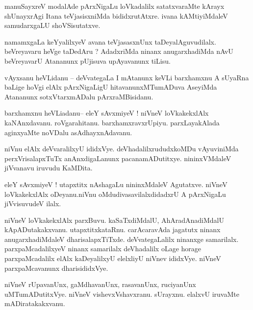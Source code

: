 \documentclass{article}
\begin{document}
\begin{mng}%
manuSayxreV modalAde pArxNigaLu loVkadalilx satatxvaraMte kArayx shUnayxrAgi Itana teVjasisxniMda 
bididxrutAtxre. ivana kAMtiyiMdaleV samudarxgaLU shoVSisutatxve.
\end{mng}

\begin{mng}%
namamxgaLa keYyalilxyeV avana teVjasasxnUnx taDeyalAguvudilalx. beVreyavaru heVge taDedAru ? 
AdadxriMda ninanx anugarxhadiMda nAvU beVreyavarU Atananunx pUjisuva upAyavanunx tiLisu.
\end{mng}

\begin{mng}%
vAyxsanu heVLidanu -- deVvategaLa I mAtanunx keVLi barxhamxnu A sUyaRna baLige hoVgi elAlx 
pArxNigaLigU hitavanunxMTumADuva AseyiMda Atananunx sotxVtarxmADalu pArxraMBisidanu.
\end{mng}

\begin{mng}%
barxhamxnu heVLiadanu-- eleY sAvxmiyeV ! niVneV loVkakekxlAlx kaNAnxdavanu. roVgarahitanu. 
barxhamxravxrUpiyu. parxLayakAlada aginxyaMte noVDalu asAdhayxnAdavanu.
\end{mng}

\begin{mng}%
niVnu elAlx deVvaralilxyU ididxVye. deVhadalilxrududxkoMDu vAyuviniMda perxVrisalapxTuTx 
anAnxdigaLanunx pacanamADutitxye. nininxVMdaleV jiVvanavu iruvudu KaMDita.
\end{mng}

\begin{mng}%
eleY sAvxmiyeV ! utapxtitx nAshagaLu nininxMdaleV Agutatxve. niVneV loVkakekxlAlx oDeyanu.niVnu 
oMdudivasavilalxdidadxrU A pArxNigaLu jiVvisuvudeV ilalx.
\end{mng}

\begin{mng}%
niVneV loVkakekxlAlx parxBuvu. kaSaTxdiMdalU, AhAradAnadiMdalU kApADutakakxvanu. utapxtitxkataRnu. 
carAcaravAda jagatutx ninanx anugarxhadiMdaleV dharisalapxTiTxde. deVvategaLalilx ninanxge 
samarilalx. parxpaMcadalilxyeV ninanx samarilalx deVhadalilx oLage horage parxpaMcadalilx elAlx 
kaDeyalilxyU elelxliyU niVnev ididxVye. niVneV parxpaMcavanunx dharisididxVye.
\end{mng}

\begin{mng}%
niVneV rUpavanUnx, gaMdhavanUnx, rasavanUnx, ruciyanUnx uMTumADutitxVye. niVneV vishevxVshavxranu. 
sUrayxnu. elalxvU iruvaMte mADiratakakxvanu.
\end{mng}
\end{document}
